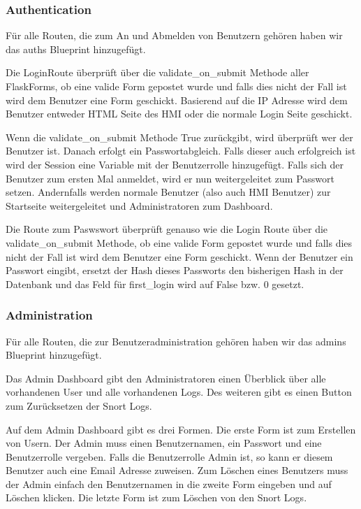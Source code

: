 \documentclass[letterpaper,10pt,ngerman]{sphinxmanual}
\begin{document}
\subsubsection{Authentication}
\label{\detokenize{webapp:authentication}}
Für alle Routen, die zum An\sphinxhyphen{} und Abmelden von Benutzern gehören haben wir das auths Blueprint hinzugefügt.

Die Login\sphinxhyphen{}Route überprüft über die validate\_on\_submit Methode aller FlaskForms, ob eine valide Form gepostet wurde und falls dies nicht der Fall ist wird dem Benutzer eine Form geschickt. Basierend auf die IP Adresse wird dem Benutzer entweder HTML Seite des HMI oder die normale Login Seite geschickt.

Wenn die validate\_on\_submit Methode True zurückgibt, wird überprüft wer der Benutzer ist. Danach erfolgt ein Passwortabgleich. Falls dieser auch erfolgreich ist wird der Session eine Variable mit der Benutzerrolle
hinzugefügt. Falls sich der Benutzer zum ersten Mal anmeldet, wird er nun weitergeleitet zum Passwort setzen. Andernfalls werden normale Benutzer (also auch HMI Benutzer) zur Startseite weitergeleitet und Administratoren zum Dashboard.

Die Route zum Paswswort überprüft genauso wie die Login Route über die validate\_on\_submit Methode, ob eine valide Form gepostet wurde und falls dies nicht der Fall ist wird dem Benutzer eine Form geschickt. Wenn der Benutzer ein Passwort eingibt, ersetzt der Hash dieses Passworts den bisherigen Hash in der Datenbank und das Feld für first\_login wird auf False bzw. 0 gesetzt.


\subsubsection{Administration}
\label{\detokenize{webapp:administration}}
Für alle Routen, die zur Benutzeradministration gehören haben wir das admins Blueprint hinzugefügt.

Das Admin Dashboard gibt den Administratoren einen Überblick über alle vorhandenen User und alle vorhandenen Logs. Des weiteren gibt es einen Button zum Zurücksetzen der Snort Logs.

Auf dem Admin Dashboard gibt es drei Formen. Die erste Form ist zum Erstellen von Usern. Der Admin muss einen Benutzernamen, ein Passwort und eine Benutzerrolle vergeben. Falls die Benutzerrolle Admin ist, so kann er diesem Benutzer auch eine Email Adresse zuweisen. Zum Löschen eines Benutzers muss der Admin einfach den Benutzernamen in die zweite Form eingeben und auf Löschen klicken. Die letzte Form ist zum Löschen von den Snort Logs.
\end{document}
